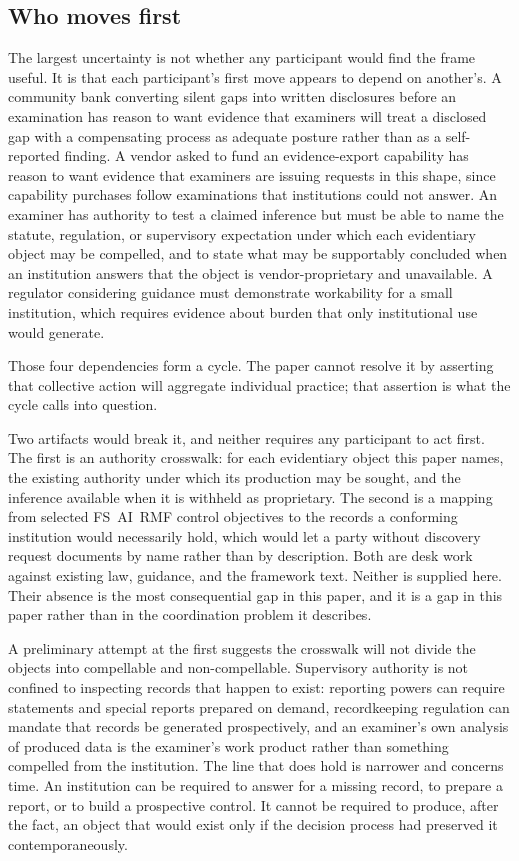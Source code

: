 \subsection{Who moves first}
\label{sec:uncertainties:first-move}

The largest uncertainty is not whether any participant would find the frame
useful. It is that each participant's first move appears to depend on another's.
A community bank converting silent gaps into written disclosures before an
examination has reason to want evidence that examiners will treat a disclosed
gap with a compensating process as adequate posture rather than as a
self-reported finding. A vendor asked to fund an evidence-export capability has
reason to want evidence that examiners are issuing requests in this shape, since
capability purchases follow examinations that institutions could not answer. An
examiner has authority to test a claimed inference but must be able to name the
statute, regulation, or supervisory expectation under which each evidentiary
object may be compelled, and to state what may be supportably concluded when an
institution answers that the object is vendor-proprietary and unavailable. A
regulator considering guidance must demonstrate workability for a small
institution, which requires evidence about burden that only institutional use
would generate.

Those four dependencies form a cycle. The paper cannot resolve it by asserting
that collective action will aggregate individual practice; that assertion is
what the cycle calls into question.

Two artifacts would break it, and neither requires any participant to act
first. The first is an authority crosswalk: for each evidentiary object this
paper names, the existing authority under which its production may be sought,
and the inference available when it is withheld as proprietary. The second is a
mapping from selected FS~AI~RMF control objectives to the records a conforming
institution would necessarily hold, which would let a party without discovery
request documents by name rather than by description. Both are desk work
against existing law, guidance, and the framework text. Neither is supplied
here. Their absence is the most consequential gap in this paper, and it is a
gap in this paper rather than in the coordination problem it describes.

A preliminary attempt at the first suggests the crosswalk will not divide the
objects into compellable and non-compellable. Supervisory authority is not
confined to inspecting records that happen to exist: reporting powers can
require statements and special reports prepared on demand, recordkeeping
regulation can mandate that records be generated prospectively, and an
examiner's own analysis of produced data is the examiner's work product rather
than something compelled from the institution. The line that does hold is
narrower and concerns time. An institution can be required to answer for a
missing record, to prepare a report, or to build a prospective control. It
cannot be required to produce, after the fact, an object that would exist only
if the decision process had preserved it contemporaneously.


